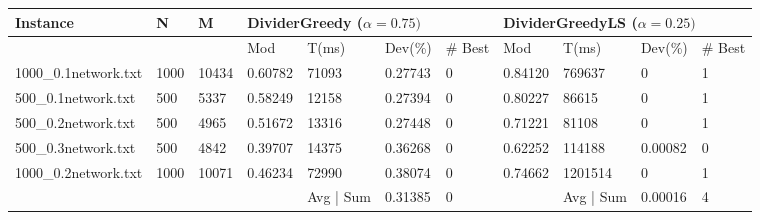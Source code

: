 \begin{sidewaystable}
	\begin{tabular}{lllllllllll}
		\hline
		\multicolumn{1}{|l|}{Instance}             & \multicolumn{1}{l|}{N}    & \multicolumn{1}{l|}{M}     & \multicolumn{4}{l|}{DividerGreedy ($\alpha = 0.75)$}                                                                                 & \multicolumn{4}{l|}{DividerGreedyLS ($\alpha = 0.25)$}                                                                                 \\ \hline
		\multicolumn{1}{|l|}{}                     & \multicolumn{1}{l|}{}     & \multicolumn{1}{l|}{}      & \multicolumn{1}{l|}{Mod}     & \multicolumn{1}{l|}{T(ms)} & \multicolumn{1}{l|}{Dev(\%)} & \multicolumn{1}{l|}{\# Best} & \multicolumn{1}{l|}{Mod}     & \multicolumn{1}{l|}{T(ms)}   & \multicolumn{1}{l|}{Dev(\%)} & \multicolumn{1}{l|}{\# Best} \\ \hline
		\multicolumn{1}{|l|}{1000\_0.1network.txt} & \multicolumn{1}{l|}{1000} & \multicolumn{1}{l|}{10434} & \multicolumn{1}{l|}{0.60782} & \multicolumn{1}{l|}{71093} & \multicolumn{1}{l|}{0.27743} & \multicolumn{1}{l|}{0}       & \multicolumn{1}{l|}{0.84120} & \multicolumn{1}{l|}{769637}  & \multicolumn{1}{l|}{0}       & \multicolumn{1}{l|}{1}       \\ \hline
		\multicolumn{1}{|l|}{500\_0.1network.txt}  & \multicolumn{1}{l|}{500}  & \multicolumn{1}{l|}{5337}  & \multicolumn{1}{l|}{0.58249} & \multicolumn{1}{l|}{12158} & \multicolumn{1}{l|}{0.27394} & \multicolumn{1}{l|}{0}       & \multicolumn{1}{l|}{0.80227} & \multicolumn{1}{l|}{86615}   & \multicolumn{1}{l|}{0}       & \multicolumn{1}{l|}{1}       \\ \hline
		\multicolumn{1}{|l|}{500\_0.2network.txt}  & \multicolumn{1}{l|}{500}  & \multicolumn{1}{l|}{4965}  & \multicolumn{1}{l|}{0.51672} & \multicolumn{1}{l|}{13316} & \multicolumn{1}{l|}{0.27448} & \multicolumn{1}{l|}{0}       & \multicolumn{1}{l|}{0.71221} & \multicolumn{1}{l|}{81108}   & \multicolumn{1}{l|}{0}       & \multicolumn{1}{l|}{1}       \\ \hline
		\multicolumn{1}{|l|}{500\_0.3network.txt}  & \multicolumn{1}{l|}{500}  & \multicolumn{1}{l|}{4842}  & \multicolumn{1}{l|}{0.39707} & \multicolumn{1}{l|}{14375} & \multicolumn{1}{l|}{0.36268} & \multicolumn{1}{l|}{0}       & \multicolumn{1}{l|}{0.62252} & \multicolumn{1}{l|}{114188}  & \multicolumn{1}{l|}{0.00082} & \multicolumn{1}{l|}{0}       \\ \hline
		\multicolumn{1}{|l|}{1000\_0.2network.txt} & \multicolumn{1}{l|}{1000} & \multicolumn{1}{l|}{10071} & \multicolumn{1}{l|}{0.46234} & \multicolumn{1}{l|}{72990} & \multicolumn{1}{l|}{0.38074} & \multicolumn{1}{l|}{0}       & \multicolumn{1}{l|}{0.74662} & \multicolumn{1}{l|}{1201514} & \multicolumn{1}{l|}{0}       & \multicolumn{1}{l|}{1}       \\ \hline
		&                           &                            &                              & Avg | Sum                           & 0.31385                      & 0                            &                              & Avg | Sum                             & 0.00016                      & 4                           
	\end{tabular}


\end{sidewaystable}

